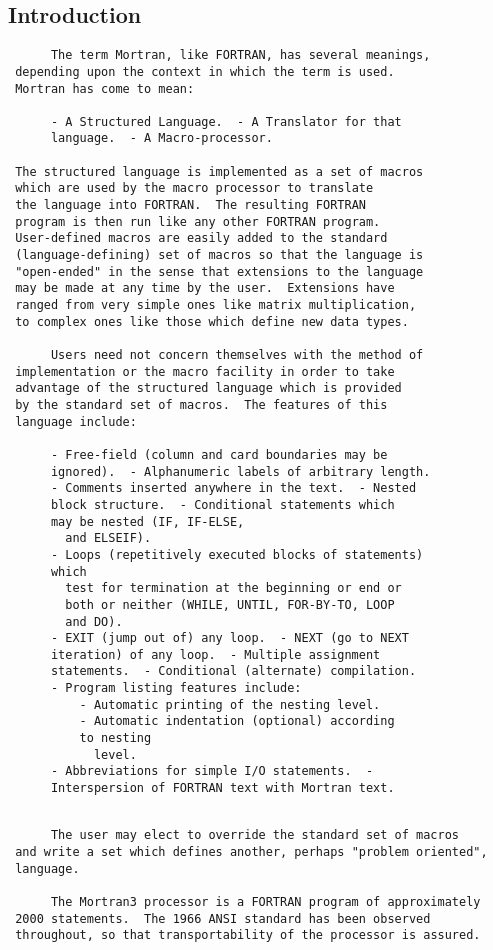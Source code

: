  \subsection{Introduction} 
 \begin{verbatim}
      The term Mortran, like FORTRAN, has several meanings,
 depending upon the context in which the term is used.
 Mortran has come to mean:

      - A Structured Language.  - A Translator for that
      language.  - A Macro-processor.

 The structured language is implemented as a set of macros
 which are used by the macro processor to translate
 the language into FORTRAN.  The resulting FORTRAN
 program is then run like any other FORTRAN program.
 User-defined macros are easily added to the standard
 (language-defining) set of macros so that the language is
 "open-ended" in the sense that extensions to the language
 may be made at any time by the user.  Extensions have
 ranged from very simple ones like matrix multiplication,
 to complex ones like those which define new data types.

      Users need not concern themselves with the method of
 implementation or the macro facility in order to take
 advantage of the structured language which is provided
 by the standard set of macros.  The features of this
 language include:

      - Free-field (column and card boundaries may be
      ignored).  - Alphanumeric labels of arbitrary length.
      - Comments inserted anywhere in the text.  - Nested
      block structure.  - Conditional statements which
      may be nested (IF, IF-ELSE,
        and ELSEIF).
      - Loops (repetitively executed blocks of statements)
      which
        test for termination at the beginning or end or
        both or neither (WHILE, UNTIL, FOR-BY-TO, LOOP
        and DO).
      - EXIT (jump out of) any loop.  - NEXT (go to NEXT
      iteration) of any loop.  - Multiple assignment
      statements.  - Conditional (alternate) compilation.
      - Program listing features include:
          - Automatic printing of the nesting level.
          - Automatic indentation (optional) according
          to nesting
            level.
      - Abbreviations for simple I/O statements.  -
      Interspersion of FORTRAN text with Mortran text.
\end{verbatim} 

\newpage \begin{verbatim}

      The user may elect to override the standard set of macros
 and write a set which defines another, perhaps "problem oriented",
 language.
 
      The Mortran3 processor is a FORTRAN program of approximately
 2000 statements.  The 1966 ANSI standard has been observed
 throughout, so that transportability of the processor is assured.
 
 \end{verbatim}
